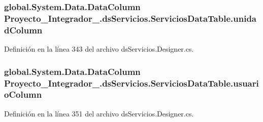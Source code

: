 \hypertarget{class_proyecto___integrador__3_1_1ds_servicios_1_1_servicios_data_table_ab0e7d5e73c91967ce47805cbefda5db3}{
\subsubsection[{unidad\-Column}]{\setlength{\rightskip}{0pt plus 5cm}global.\-System.\-Data.\-Data\-Column Proyecto\-\_\-\-Integrador\-\_.\-ds\-Servicios.\-Servicios\-Data\-Table.\-unidad\-Column\hspace{0.3cm}{\ttfamily [get]}}}\label{class_proyecto___integrador__3_1_1ds_servicios_1_1_servicios_data_table_ab0e7d5e73c91967ce47805cbefda5db3}


Definición en la línea 343 del archivo ds\-Servicios.\-Designer.\-cs.

\hypertarget{class_proyecto___integrador__3_1_1ds_servicios_1_1_servicios_data_table_ad22d89a1b9164d0edfee2ab6580bd23a}{
\subsubsection[{usuario\-Column}]{\setlength{\rightskip}{0pt plus 5cm}global.\-System.\-Data.\-Data\-Column Proyecto\-\_\-\-Integrador\-\_.\-ds\-Servicios.\-Servicios\-Data\-Table.\-usuario\-Column\hspace{0.3cm}{\ttfamily [get]}}}\label{class_proyecto___integrador__3_1_1ds_servicios_1_1_servicios_data_table_ad22d89a1b9164d0edfee2ab6580bd23a}


Definición en la línea 351 del archivo ds\-Servicios.\-Designer.\-cs.



